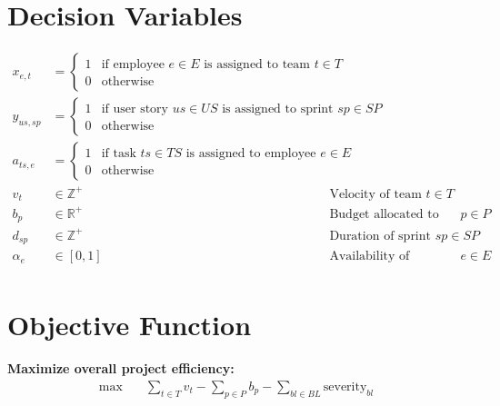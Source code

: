 \documentclass{article}
\begin{document}
\section*{Decision Variables}
\begin{align*}
x_{e,t} &=
\begin{cases}
1 & \text{if employee } e \in E \text{ is assigned to team } t \in T \\
0 & \text{otherwise}
\end{cases} \\
y_{us,sp} &=
\begin{cases}
1 & \text{if user story } us \in US \text{ is assigned to sprint } sp \in SP \\
0 & \text{otherwise}
\end{cases} \\
a_{ts,e} &=
\begin{cases}
1 & \text{if task } ts \in TS \text{ is assigned to employee } e \in E \\
0 & \text{otherwise}
\end{cases} \\
v_t & \in \mathbb{Z}^{+} & \text{Velocity of team } t \in T \\
b_p & \in \mathbb{R}^{+} & \text{Budget allocated to project } p \in P \\
d_{sp} & \in \mathbb{Z}^{+} & \text{Duration of sprint } sp \in SP \\
\alpha_e & \in [0, 1] & \text{Availability of employee } e \in E \\
\end{align*}

\section*{Objective Function}
\textbf{Maximize overall project efficiency:}
\begin{align*}
\max \quad & \sum_{t \in T} v_t - \sum_{p \in P} b_p - \sum_{bl \in BL} \text{severity}_{bl}
\end{align*}
\end{document}
